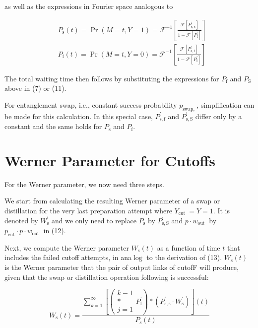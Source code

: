 \documentclass{masterthesis}
\begin{document}
as well as the expressions in Fourier space analogous to

$$
\begin{aligned}
& P_{\mathrm{s}}(t)=\operatorname{Pr}(M=t, Y=1)=\mathcal{F}^{-1}\left[\frac{\mathcal{F}\left[P_{\mathrm{s}, \mathrm{s}}^{\prime}\right]}{1-\mathcal{F}\left[P_{\mathrm{f}}^{\prime}\right]}\right] \\
& P_{\mathrm{f}}(t)=\operatorname{Pr}(M=t, Y=0)=\mathcal{F}^{-1}\left[\frac{\mathcal{F}\left[P_{\mathrm{s}, \mathrm{f}}^{\prime}\right]}{1-\mathcal{F}\left[P_{\mathrm{f}}^{\prime}\right]}\right]
\end{aligned}
$$

The total waiting time then follows by substituting the expressions for $P_{\mathrm{f}}$ and $P_{\mathrm{S}}$ above in (7) or (11).

For entanglement swap, i.e., constant success probability $p_{\text {swap, }}$, simplification can be made for this calculation. In this special case, $P_{\mathrm{s}, \mathrm{f}}^{\prime}$ and $P_{\mathrm{s}, \mathrm{S}}^{\prime}$ differ only by a constant and the same holds for $P_{\mathrm{s}}$ and $P_{\mathrm{f}}$.

\section*{Werner Parameter for Cutoffs}
For the Werner parameter, we now need three steps.

We start from calculating the resulting Werner parameter of a swap or distillation for the very last preparation attempt where $Y_{\text {cut }}=Y=1$. It is denoted by $W_{\mathrm{s}}^{\prime}$ and we only need to replace $P_{\mathrm{s}}$ by $P_{\mathrm{s}, \mathrm{S}}^{\prime}$ and $p \cdot w_{\text {out }}$ by $p_{\mathrm{cut}} \cdot p \cdot w_{\text {out }}$ in (12).

Next, we compute the Werner parameter $W_{\mathrm{s}}(t)$ as a function of time $t$ that includes the failed cutoff attempts, in ana$\log$ to the derivation of (13). $W_{\mathrm{s}}(t)$ is the Werner parameter that the pair of output links of cutofF will produce, given that the swap or distillation operation following is successful:

$$
W_{\mathrm{s}}(t)=\frac{\sum_{k=1}^{\infty}\left[\left(\begin{array}{c}
k-1 \\
* \\
j=1
\end{array} P_{\mathrm{f}}^{\prime}\right) *\left(P_{\mathrm{s}, \mathrm{s}}^{\prime} \cdot W_{\mathrm{s}}^{\prime}\right)\right](t)}{P_{\mathrm{s}}(t)}
$$
\end{document}
